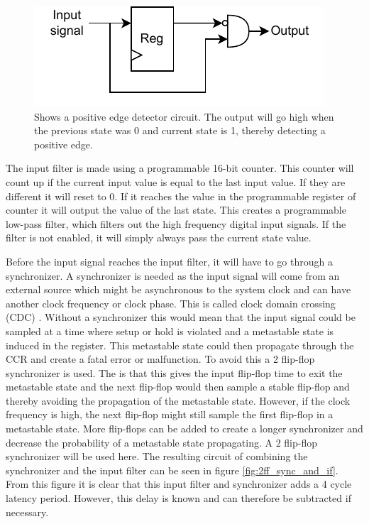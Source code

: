 \documentclass[./dissertation.tex]{subfiles}
\begin{document}
\begin{figure}[H]
    \centering
    \includegraphics[width = 0.6\linewidth]{subfiles/imgs/IP_Blocks_Pics/edgedetector.drawio.pdf}
    \caption{Shows a positive edge detector circuit. The output will go high when the previous state was 0 and current state is 1, thereby detecting a positive edge.}
    \label{fig:peDetector}
\end{figure}

The input filter is made using a programmable 16-bit counter. This counter will count up if the current input value is equal to the last input value. If they are different it will reset to 0. If it reaches the value in the programmable register of counter it will output the value of the last state. This creates a programmable low-pass filter, which filters out the high frequency digital input signals. If the filter is not enabled, it will simply always pass the current state value.

Before the input signal reaches the input filter, it will have to go through a synchronizer. A synchronizer is needed as the input signal will come from an external source which might be asynchronous to the system clock and can have another clock frequency or clock phase. This is called clock domain crossing (CDC) \cite{cdc_book}. Without a synchronizer this would mean that the input signal could be sampled at a time where setup or hold is violated and a metastable state is induced in the register. This metastable state could then propagate through the CCR and create a fatal error or malfunction. To avoid this a 2 flip-flop synchronizer is used. The is that this gives the input flip-flop time to exit the metastable state and the next flip-flop would then sample a stable flip-flop and thereby avoiding the propagation of the metastable state. However, if the clock frequency is high, the next flip-flop might still sample the first flip-flop in a metastable state. More flip-flops can be added to create a longer synchronizer and decrease the probability of a metastable state propagating. A 2 flip-flop synchronizer will be used here. The resulting circuit of combining the synchronizer and the input filter can be seen in figure \ref{fig:2ff_sync_and_if}. From this figure it is clear that this input filter and synchronizer adds a 4 cycle latency period. However, this delay is known and can therefore be subtracted if necessary. 
\end{document}
